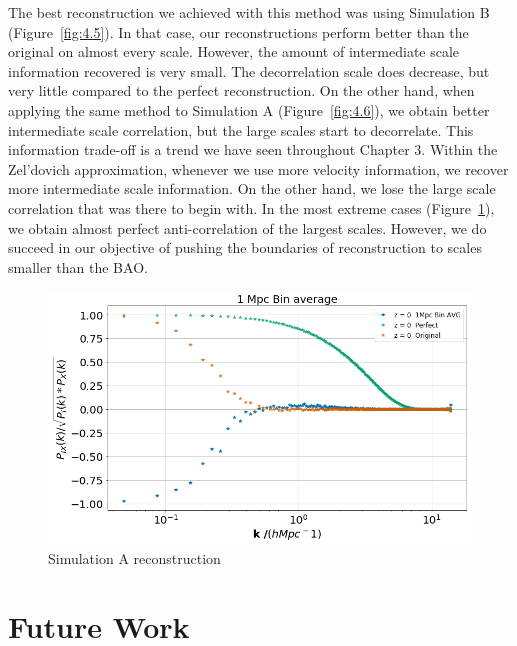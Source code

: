 The best reconstruction we achieved with this method was using Simulation B (Figure~\ref{fig:4.5}). In that case, our reconstructions perform better than the original on almost every scale. However, the amount of intermediate scale information recovered is very small. The decorrelation scale does decrease, but very little compared to the perfect reconstruction. On the other hand, when applying the same method to Simulation A (Figure~\ref{fig:4.6}), we obtain better intermediate scale correlation, but the large scales start to decorrelate. This information trade-off is a trend we have seen throughout Chapter 3. Within the Zel'dovich approximation, whenever we use more velocity information, we recover more intermediate scale information. On the other hand, we lose the large scale correlation that was there to begin with. In the most extreme cases (Figure~\ref{fig:last}), we obtain almost perfect anti-correlation of the largest scales. However, we do succeed in our objective of pushing the boundaries of reconstruction to scales smaller than the BAO. 


\begin{figure}
    \centering
    \includegraphics[width=1\columnwidth]{images/realRecon/1MpcBinAvg.png}%
    
    \caption{
        Simulation A reconstruction
        }
        
        \label{fig:last}
\end{figure}

\section{Future Work}
    
